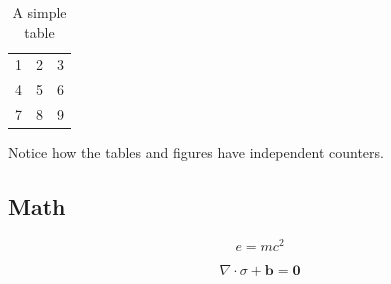         \begin{table}
          \centering
            \begin{tabular}{| l c r |}
            \hline
            1 & 2 & 3 \\
            4 & 5 & 6 \\
            7 & 8 & 9 \\
            \hline
            \end{tabular}
          \caption{A simple table}
        \end{table}

        Notice how the tables and figures have independent counters.

    \subsection{Math}

        \begin{equation}
            e = mc^2
        \end{equation}

        \begin{equation}
            \nabla \cdot \sigma + \mathbf{b} = \mathbf{0}
        \end{equation}




